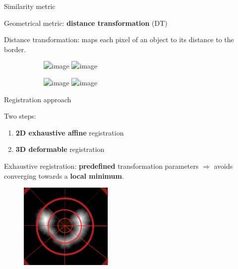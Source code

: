 \documentclass[10pt]{beamer}
\begin{document}
\begin{frame}{Similarity metric}

  Geometrical metric: \textbf{distance transformation} (DT)

  \alert{Distance transformation}: maps each pixel of an object to its distance to the border.

  \begin{figure}[ht]
    \centering
    \begin{subfigure}[t]{0.5\textwidth}
      \centering
      \includegraphics<1>[width=0.65\textwidth]{fig/mri_slice6.png}%
      \includegraphics<2>[width=0.65\textwidth]{fig/mri_slice6_dt.png}
      \caption{}
      \label{subfig:mri_slice6_dt.png}
    \end{subfigure}%
    \begin{subfigure}[t]{0.5\textwidth}
      \centering
      \includegraphics<1>[width=0.65\textwidth]{fig/maldi_slice6.png}%
      \includegraphics<2>[width=0.65\textwidth]{fig/maldi_slice6_dt.png}
      \caption{}
      \label{subfig:maldi_slice6_dt.png}
    \end{subfigure}%
  \end{figure}

  
\end{frame}

\begin{frame}{Registration approach}
  
  Two steps:
  \begin{enumerate}
  \item \textbf{2D exhaustive affine} registration
  \item \textbf{3D deformable} registration
  \end{enumerate}

  \alert{Exhaustive registration}: \textbf{predefined} transformation parameters  $\Rightarrow$ avoids converging towards a \textbf{local minimum}.

  \begin{figure}[ht]
    \centering
    \includegraphics[width=0.4\textwidth]{fig/exhaustive_registration}
    \caption{}
    \label{fig:exhaustive_registration}
  \end{figure}

  
\end{frame}
\end{document}
